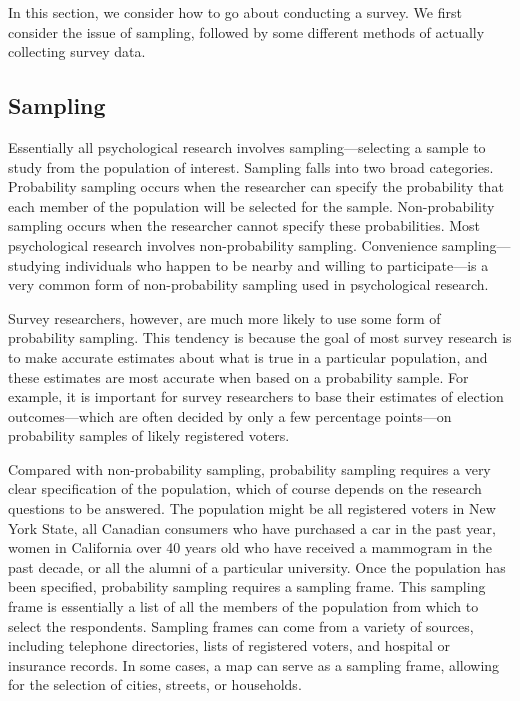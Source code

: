 In this section, we consider how to go about conducting a survey. We first consider the issue of sampling, followed by some different methods of actually collecting survey data.

\subsection{Sampling}

Essentially all psychological research involves sampling---selecting a sample to study from the population of interest. Sampling falls into two broad categories. Probability sampling occurs when the researcher can specify the probability that each member of the population will be selected for the sample. Non-probability sampling occurs when the researcher cannot specify these probabilities. Most psychological research involves non-probability sampling. Convenience sampling---studying individuals who happen to be nearby and willing to participate---is a very common form of non-probability sampling used in psychological research.

Survey researchers, however, are much more likely to use some form of probability sampling. This tendency is because the goal of most survey research is to make accurate estimates about what is true in a particular population, and these estimates are most accurate when based on a probability sample. For example, it is important for survey researchers to base their estimates of election outcomes---which are often decided by only a few percentage points---on probability samples of likely registered voters.

Compared with non-probability sampling, probability sampling requires a very clear specification of the population, which of course depends on the research questions to be answered. The population might be all registered voters in New York State, all Canadian consumers who have purchased a car in the past year, women in California over 40 years old who have received a mammogram in the past decade, or all the alumni of a particular university. Once the population has been specified, probability sampling requires a sampling frame. This sampling frame is essentially a list of all the members of the population from which to select the respondents. Sampling frames can come from a variety of sources, including telephone directories, lists of registered voters, and hospital or insurance records. In some cases, a map can serve as a sampling frame, allowing for the selection of cities, streets, or households.


